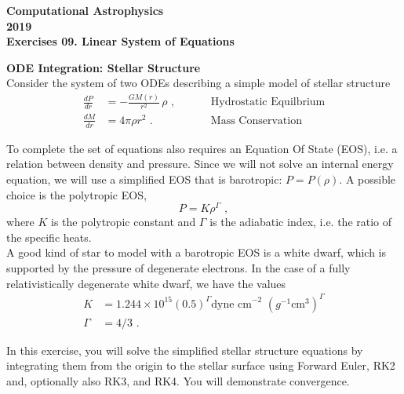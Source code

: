 \documentclass[11pt]{article}
\begin{document}
\begin{center}
\large \bf Computational Astrophysics \rm \\
2019\\
{\small Exercises 09. Linear System of Equations}
\end{center}

 {\bf ODE Integration:  Stellar Structure} \\
 
Consider the system of two ODEs describing a simple model of stellar structure
\begin{align}
\frac{dP}{dr} &= - \frac{GM(r)}{r^2}\, \rho\,\,, &\hspace{1cm}
\text{Hydrostatic Equilbrium}\\
\frac{dM}{dr} &= 4\pi \rho r^2\,\,. &\hspace{1cm} \text{Mass Conservation}
\end{align}

To complete the set of equations also requires an Equation Of State (EOS), i.e. a
relation between density and pressure. Since we will not solve an
internal energy equation, we will use a simplified EOS that is
barotropic: $P=P(\rho)$.  A possible choice is the polytropic EOS,
\begin{equation}
P = K \rho^\Gamma\,\,,
\end{equation}
where $K$ is the polytropic constant and $\Gamma$ is the adiabatic
index, i.e. the ratio of the specific heats. \\
A good kind of star to model
with a barotropic EOS is a white dwarf, which is supported by the
pressure of degenerate electrons.  In the case of a fully
relativistically degenerate white dwarf, we have the values
\begin{equation}
\begin{aligned}
K &= 1.244 \times 10^{15} (0.5)^\Gamma \text{dyne cm}^{-2}\,\, (g^{-1} \mathrm{cm^3})^\Gamma\\
\Gamma &= 4/3\,\,.
\end{aligned}
\end{equation}

In this exercise, you will solve the simplified stellar
structure equations by integrating them from the origin to the stellar
surface using Forward Euler, RK2 and, optionally also RK3, and
RK4. You will demonstrate convergence. 
\end{document}

